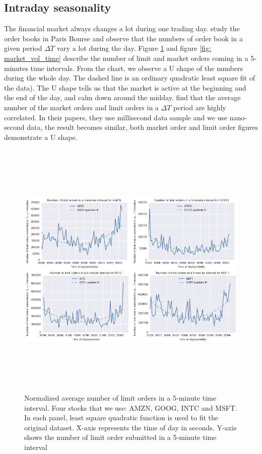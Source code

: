 \subsection{Intraday seasonality} 
The financial market always changes a lot during one trading day. \cite{biais1995empirical} study the order books in Paris Bourse and observe that the numbers of order book in a given period $\Delta T$ vary a lot during the day. Figure \ref{fig: limit_vol_time} and figure \ref {fig: market_vol_time} describe the number of limit and market orders coming in a 5-minutes time intervals. From the chart,  we observe a U shape of the numbers during the whole day. The dashed line is an ordinary quadratic least square fit of the data). The U shape tells us that the market is active at the beginning and the end of the day,  and calm down around the midday. \cite{potters2003more} find that the average number of the market orders and limit orders in a $\Delta T$ period are highly correlated. In their papers,  they use millisecond data sample and we use nano-second data,  the result becomes similar,  both market order and limit order figures demonstrate a U shape. 

\begin{figure}[hbtp]
	\begin{center}
		\includegraphics[width=6in, height=5in]{figures/limit_vol_time.png}
	\end{center}
	\caption{Normalized average number of limit orders in a 5-minute time interval. Four stocks that we use:  AMZN, GOOG, INTC and MSFT. In each panel, least square quadratic function is used to fit the original dataset. X-axis represents the time of day in seconds. Y-axis shows the number of limit order submitted in a 5-minute time interval} \label{fig: limit_vol_time}
\end{figure}


